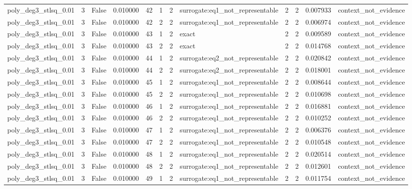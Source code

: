 \begin{tabular}{lrrrrrrlrrrl}
poly\_deg3\_stlsq\_0.01 & 3 & False & 0.010000 & 42 & 1 & 2 & surrogate:eq1\_not\_representable & 2 & 2 & 0.007933 & context\_not\_evidence \\
poly\_deg3\_stlsq\_0.01 & 3 & False & 0.010000 & 42 & 2 & 2 & surrogate:eq1\_not\_representable & 2 & 2 & 0.006974 & context\_not\_evidence \\
poly\_deg3\_stlsq\_0.01 & 3 & False & 0.010000 & 43 & 1 & 2 & exact & 2 & 2 & 0.009589 & context\_not\_evidence \\
poly\_deg3\_stlsq\_0.01 & 3 & False & 0.010000 & 43 & 2 & 2 & exact & 2 & 2 & 0.014768 & context\_not\_evidence \\
poly\_deg3\_stlsq\_0.01 & 3 & False & 0.010000 & 44 & 1 & 2 & surrogate:eq2\_not\_representable & 2 & 2 & 0.020842 & context\_not\_evidence \\
poly\_deg3\_stlsq\_0.01 & 3 & False & 0.010000 & 44 & 2 & 2 & surrogate:eq2\_not\_representable & 2 & 2 & 0.018001 & context\_not\_evidence \\
poly\_deg3\_stlsq\_0.01 & 3 & False & 0.010000 & 45 & 1 & 2 & surrogate:eq1\_not\_representable & 2 & 2 & 0.008644 & context\_not\_evidence \\
poly\_deg3\_stlsq\_0.01 & 3 & False & 0.010000 & 45 & 2 & 2 & surrogate:eq1\_not\_representable & 2 & 2 & 0.010698 & context\_not\_evidence \\
poly\_deg3\_stlsq\_0.01 & 3 & False & 0.010000 & 46 & 1 & 2 & surrogate:eq1\_not\_representable & 2 & 2 & 0.016881 & context\_not\_evidence \\
poly\_deg3\_stlsq\_0.01 & 3 & False & 0.010000 & 46 & 2 & 2 & surrogate:eq1\_not\_representable & 2 & 2 & 0.010252 & context\_not\_evidence \\
poly\_deg3\_stlsq\_0.01 & 3 & False & 0.010000 & 47 & 1 & 2 & surrogate:eq1\_not\_representable & 2 & 2 & 0.006376 & context\_not\_evidence \\
poly\_deg3\_stlsq\_0.01 & 3 & False & 0.010000 & 47 & 2 & 2 & surrogate:eq1\_not\_representable & 2 & 2 & 0.010548 & context\_not\_evidence \\
poly\_deg3\_stlsq\_0.01 & 3 & False & 0.010000 & 48 & 1 & 2 & surrogate:eq1\_not\_representable & 2 & 2 & 0.020514 & context\_not\_evidence \\
poly\_deg3\_stlsq\_0.01 & 3 & False & 0.010000 & 48 & 2 & 2 & surrogate:eq1\_not\_representable & 2 & 2 & 0.012601 & context\_not\_evidence \\
poly\_deg3\_stlsq\_0.01 & 3 & False & 0.010000 & 49 & 1 & 2 & surrogate:eq1\_not\_representable & 2 & 2 & 0.011754 & context\_not\_evidence \\

\end{tabular}
